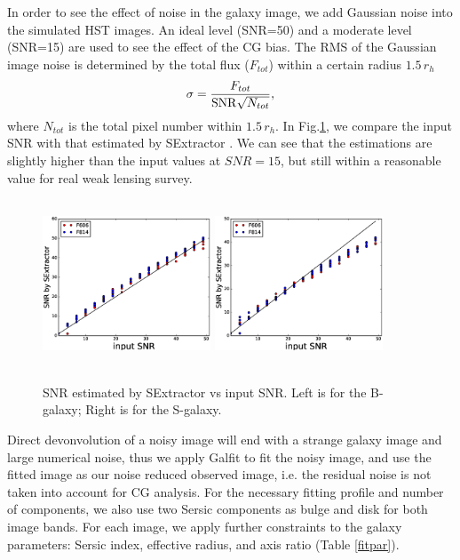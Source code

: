 \documentclass[useAMS,usenatbib]{mn2e}
\newcommand{\be}{\begin{equation}}
\newcommand{\ee}{\end{equation}}
\begin{document}
In order to see the effect of noise in the galaxy image, we add
Gaussian noise into the simulated HST images. An ideal level (SNR=50)
and a moderate level (SNR=15) are used to see the effect of the CG
bias. The RMS of the Gaussian image noise is determined by the total
flux ($F_{tot}$) within a certain radius $1.5\,r_h$
%
\be
\sigma = {F_{tot} \over {\rm SNR} \sqrt{N_{tot}} },
\ee
%
where $N_{tot}$ is the total pixel number within $1.5\,r_h$.  In
Fig.\ref{fig:ests2n}, we compare the input SNR with that estimated by
SExtractor \citep{1996A&AS..117..393B}. We can see that the
estimations are slightly higher than the input values at $SNR=15$, but
still within a reasonable value for real weak lensing survey.
%
\begin{figure}
\centerline{\includegraphics[height=5cm,width=5.0cm]{zs2ncB.eps}
\includegraphics[height=5cm,width=5.0cm]{zs2ncS.eps}}
\caption{SNR estimated by SExtractor vs input SNR. Left is for the
  B-galaxy; Right is for the S-galaxy.}
\label{fig:ests2n}
\end{figure}
%

Direct devonvolution of a noisy image will end with a strange galaxy
image and large numerical noise, thus we apply Galfit
\citep{2010AJ....139.2097P} to fit the noisy image, and use the fitted
image as our noise reduced observed image, i.e. the residual noise is
not taken into account for CG analysis. For the necessary fitting
profile and number of components, we also use two Sersic components as
bulge and disk for both image bands. For each image, we apply further
constraints to the galaxy parameters: Sersic index, effective radius,
and axis ratio (Table \ref{fitpar}).
\end{document}
